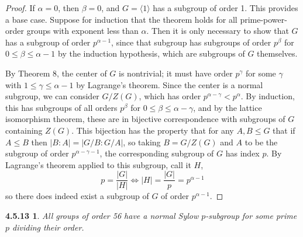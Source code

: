 \documentclass{article}
\newtheorem*{4.5.13}{4.5.13}
\begin{document}
\begin{proof}
  If $\alpha = 0$, then $\beta = 0$, and $G = \langle 1 \rangle$ has a subgroup of order 1.
  This provides a base case.
  Suppose for induction that the theorem holds for all prime-power-order groups with exponent less than $\alpha$.
  Then it is only necessary to show that $G$ has a subgroup of order $p^{\alpha - 1}$,
  since that subgroup has subgroups of order $p^{\beta}$ for $0 \leq \beta \leq \alpha - 1$ by the induction hypothesis,
  which are subgroups of $G$ themselves.

  By Theorem 8, the center of $G$ is nontrivial; it must have order $p^{\gamma}$ for some $\gamma$ with $1 \leq \gamma \leq \alpha - 1$
  by Lagrange's theorem.
  Since the center is a normal subgroup, we can consider $G / Z(G)$, which has order $p^{\alpha - \gamma} < p^{\alpha}$.
  By induction, this has subgroups of all orders $p^{\beta}$ for $0 \leq \beta \leq \alpha - \gamma$,
  and by the lattice isomorphism theorem, these are in bijective correspondence with subgroups of $G$ containing $Z(G)$.
  This bijection has the property that for any $A,B \leq G$ that if $A \leq B$ then $|B : A| = |G / B : G  / A|$,
  so taking $B = G / Z(G)$ and $A$ to be the subgroup of order $p^{\alpha - \gamma - 1}$,
  the corresponding subgroup of $G$ has index $p$.
  By Lagrange's theorem applied to this subgroup, call it $H$,
  \[
    p = \frac{|G|}{|H|} \Leftrightarrow |H| = \frac{|G|}{p} = p^{\alpha - 1}
  \]
  so there does indeed exist a subgroup of $G$ of order $p^{\alpha - 1}$.
\end{proof}

\begin{4.5.13}
  All groups of order 56 have a normal Sylow $p$-subgroup for some prime $p$ dividing their order.
\end{4.5.13}
\end{document}

